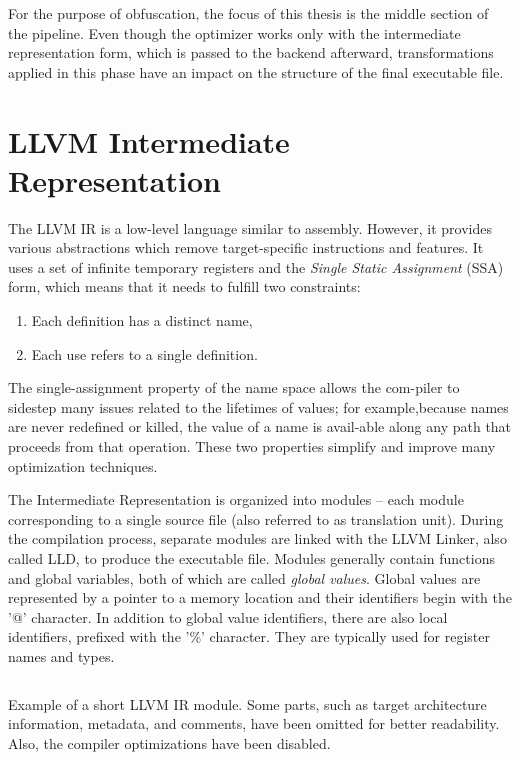 \documentclass[
  digital, %
  notable,   %
  twoside, %
  nolof,     %
  nolot,     %
]{fithesis3}
\theoremstyle{definition}
\begin{document}
For the purpose of obfuscation, the focus of this thesis is the middle section of the pipeline. Even though the optimizer works only with the intermediate representation form, which is passed to the backend afterward, transformations applied in this phase have an impact on the structure of the final executable file. 

\section{LLVM Intermediate Representation} \label{sec:ir}
The LLVM IR is a low-level language similar to assembly. However, it provides various abstractions which remove target-specific instructions and features. It uses a set of infinite temporary registers and the \textit{Single Static Assignment} (SSA) form, which means that it needs to fulfill two constraints:

\begin{enumerate}
    \item Each definition has a distinct name,
    \item Each use refers to a single definition.
\end{enumerate}

 The  single-assignment  property  of  the  name  space  allows  the  com-piler to sidestep many issues related to the lifetimes of values; for example,because names are never redefined or killed, the value of a name is avail-able along any path that proceeds from that operation. These two properties simplify and improve many optimization techniques\cite{eng_comp}.

The Intermediate Representation is organized into modules -- each module corresponding to a single source file (also referred to as translation unit). During the compilation process, separate modules are linked with the LLVM Linker, also called LLD, to produce the executable file. Modules generally contain functions and global variables, both of which are called \textit{global values}. Global values are represented by a pointer to a memory location and their identifiers begin with the '@' character. In addition to global value identifiers, there are also local identifiers, prefixed with the '\%' character. They are typically used for register names and types. 

\begin{listing}
    \inputminted{llvm}{example.ll}
    \caption{Example of a short LLVM IR module. Some parts, such as target architecture information, metadata, and comments, have been omitted for better readability. Also, the compiler optimizations have been disabled.}
    \label{fig:ir_example}
\end{listing}
\end{document}

